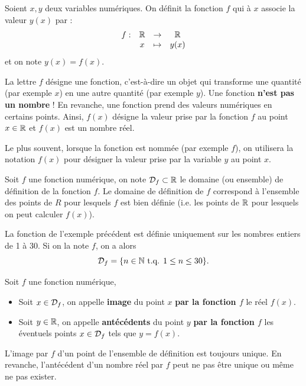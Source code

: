 \documentclass[a4paper, 12pt]{report}
\begin{document}
\begin{defn}
Soient $x, y$ deux variables numériques. On définit la fonction $f$ qui à $x$ associe la valeur $y(x)$ par :
\[ \begin{array}{c c c c} 
f : & \mathbb{R} & \to & \mathbb{R} \\
& x & \mapsto & y(x)
\end{array} \]
et on note $y(x) = f(x)$. 
\end{defn}

\begin{nomen}
La lettre $f$ désigne une fonction, c'est-à-dire un objet qui transforme une quantité (par exemple $x$) en une autre quantité (par exemple $y$). Une fonction \textbf{n'est pas un nombre} ! En revanche, une fonction prend des valeurs numériques en certains points. Ainsi, $f(x)$ désigne la valeur prise par la fonction $f$ au point $x \in \mathbb{R}$ et $f(x)$ est un nombre réel.
\end{nomen}

\begin{rmq}
Le plus souvent, lorsque la fonction est nommée (par exemple $f$), on utilisera la notation $f(x)$ pour désigner la valeur prise par la variable $y$ au point $x$.
\end{rmq}

\begin{defn}
	Soit $f$ une fonction numérique, 
	on note $\mathcal{D}_f \subset \mathbb{R}$ le domaine (ou ensemble) de définition de la fonction $f$.
	Le domaine de définition de $f$ correspond à l'ensemble des points de $R$ pour lesquels $f$ est bien définie
	(i.e. les points de $\mathbb{R}$ pour lesquels on peut calculer $f(x)$).
\end{defn}

\begin{ex}
La fonction de l'exemple précédent est définie uniquement sur les nombres entiers de 1 à 30. 
Si on la note $f$, on a alors 
\[ \mathcal{D}_f = \{ n \in \mathbb{N} \text{ t.q. } 1 \leq n \leq 30 \}. \]
\end{ex}

\begin{defn}
Soit $f$ une fonction numérique,
\begin{itemize}
\item Soit $x \in \mathcal{D}_f$, on appelle \textbf{image} du point $x$ \textbf{par la fonction $f$} le réel $f(x)$.
\item Soit $y \in \mathbb{R}$, on appelle \textbf{antécédents} du point $y$ \textbf{par la fonction $f$} 
les éventuels points $x \in \mathcal{D}_f$ tels que $y=f(x)$.
\end{itemize}
L'image par $f$ d'un point de l'ensemble de définition est toujours unique. 
En revanche, l'antécédent d'un nombre réel par $f$ peut ne pas être unique ou même ne pas exister.
\end{defn}
\end{document}

